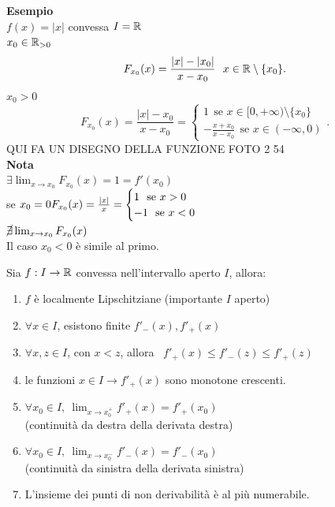 \documentclass[12px]{article}
\begin{document}
	\textbf{Esempio}\\
	$f(x) = |x|$ convessa  $I = \mathbb{R}$\\
	$x_0\in \mathbb{R}_{>0}$\\
	 \[
		 F_{x_0}(x) = \frac{|x| - |x_0|}{x-x_0} \ \ x\in \R\setminus\{x_0\}
	 .\] 
	 $x_0 >0 $\[
		 F_{x_0}(x) = \frac{|x| - x_0}{x-x_0} = \begin{cases}
			 1\ \ \text{se }x\in [0,+\infty)\setminus\{x_0\}\\
			 -\frac{x + x_0}{x-x_0}\ \ \text{se }x\in (-\infty,0)
		 \end{cases}
	 .\] 
	 QUI FA UN DISEGNO DELLA FUNZIONE FOTO 2 54\\
	 \textbf{Nota}\\
	 $\exists \lim_{x \rightarrow x_0} F_{x_0}(x) = 1 = f'(x_0)$\\
	 se $x_0 = 0\\
	 F_{x_0}(x) = \frac { |x|}{x} = \begin{cases}
		 1\ \ \text{se } x > 0\\
		 -1 \ \ \text{se } x < 0 
	 \end{cases}$ \\
	 $\cancel \exists \lim_{x \rightarrow x_0}F_{x_0}(x)$ \\
	 Il caso $x_0 < 0 $ è simile al primo.
	 \begin{teo}
	 	Sia $f: I \rightarrow \mathbb{R}$ convessa nell'intervallo aperto $I$, allora:
		 \begin{enumerate}
			 \item $f$ è localmente Lipschitziane (importante $I$ aperto)
			 \item $\forall x\in I$, esistono finite  $f'_-(x),f'_+(x)$
			 \item  $\forall x, z\in I$, con $x < z$, allora \ $f'_+(x)\leq f'_-(z)\leq f'_+(z)$ 
			 \item le funzioni $x\in I \rightarrow f'_+(x)$ sono monotone crescenti.
			 \item $\forall x_0\in I, \ \lim_{x \rightarrow x_0^+}f'_+(x) = f'_+(x_0)$ \\ (continuità da destra della derivata destra)
			 \item $\forall x_0\in I, \ \lim_{x \rightarrow x_0^-}f'_-(x) = f'_-(x_0)$ \\ (continuità da sinistra della derivata sinistra)
			 \item L'insieme dei punti di non derivabilità è al più numerabile.
		\end{enumerate}
	 \end{teo}
\end{document}
